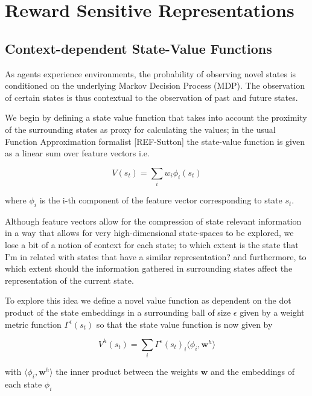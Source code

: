 \documentclass{article}
\begin{document}
\section{Reward Sensitive Representations}

\subsection{Context-dependent State-Value Functions}

As agents experience environments, the probability of observing novel states 
is conditioned on the underlying Markov Decision Process (MDP). The observation
of certain states is thus contextual to the observation of past and future states.

We begin by defining a state value function that takes into account the proximity 
of the surrounding states as proxy for calculating the values; in the usual Function Approximation
formalist [REF-Sutton] the state-value function is given as a linear sum over feature vectors i.e.

\begin{equation}
  V(s_t) = \sum_i w_i \phi_i(s_t)
\end{equation}

where $\phi_i$ is the i-th component of the feature vector corresponding to state $s_t$.

Although feature vectors allow for the compression of state relevant information in a way that 
allows for very high-dimensional state-spaces to be explored, we lose a bit of a notion of context
for each state; to which extent is the state that I'm in related with states that have a similar representation? 
and furthermore, to which extent should the information gathered in surrounding states affect the representation of the current state.

To explore this idea we define a novel value function as dependent on the dot product of the state embeddings in 
a surrounding ball of size $\epsilon$ given by a weight metric function $\Gamma^\epsilon(s_t)$ so that the 
state value function is now given by 

\begin{equation}
  V^h(s_t) = \sum_{i} \Gamma^\epsilon(s_t)_i \langle\phi_i,\mathbf{w}^h\rangle
\end{equation}

with $\langle\phi_i,\mathbf{w}^h\rangle$ the inner product between the weights $\mathbf{w}$ and the embeddings of each state $\phi_i$
\end{document}
